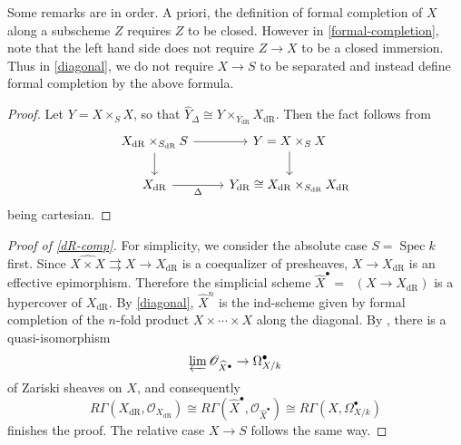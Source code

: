 \documentclass{article}
\theoremstyle{definition}
\theoremstyle{remark}
\newcommand{\scr}[1]{\mathscr{#1}}
\DeclareMathOperator{\spec}{Spec}
\DeclareMathOperator{\dr}{dR}
\DeclareMathOperator{\cech}{\check{C}ech}
\begin{document}
Some remarks are in order. A priori, the definition of formal completion of $X$ along a subscheme $Z$ requires $Z$ to be closed. However in \ref{formal-completion}, note that the left hand side does not require $Z \to X$ to be a closed immersion. Thus in \ref{diagonal}, we do not require $X \to S$ to be separated and instead define formal completion by the above formula.

\begin{proof}

Let $Y = X \times_S X$, so that $\widehat{Y}_\Delta \cong Y \times_{Y_{\dr}} X_{\dr}$. Then the fact follows from%
\[\begin{tikzcd}
  {X_{\dr} \times_{S_{\dr}} S} & {Y = X \times_S X} \\
  {X_{\dr}} & {Y_{\dr} \cong X_{\dr} \times_{S_{\dr}} X_{\dr}}
  \arrow[from=1-1, to=1-2]
  \arrow[from=1-1, to=2-1]
  \arrow[from=1-2, to=2-2]
  \arrow["\Delta"', from=2-1, to=2-2]
\end{tikzcd}\]
being cartesian.
\end{proof}

\begin{proof}[Proof of \ref{dR-comp}] 

For simplicity, we consider the absolute case $S = \spec k$ first. Since $\widehat{X \times X} \rightrightarrows X \to X_{\dr}$ is a coequalizer of presheaves, $X \to X_{\dr}$ is an effective epimorphism. Therefore the simplicial scheme $\widehat{X}^\bullet = \cech(X \to X_{\dr})$ is a hypercover of $X_{\dr}$. By \ref{diagonal}, $\widehat{X}^n$ is the ind-scheme given by formal completion of the $n$-fold product $X \times \cdots \times X$ along the diagonal. By \cite{Rod25}, there is a quasi-isomorphism
$$ \varprojlim \scr{O}_{\widehat{X}^\bullet} \to \Omega^\bullet_{X/k}$$
of Zariski sheaves on $X$, and consequently
$$ R\Gamma(X_{\dr},\scr{O}_{X_{\dr}}) \cong R\Gamma(\widehat{X}^\bullet, \scr{O}_{\widehat{X}^\bullet}) \cong R\Gamma(X,\Omega^\bullet_{X/k})$$
finishes the proof. The relative case $X \to S$ follows the same way.
\end{proof}
{}
\end{document}
